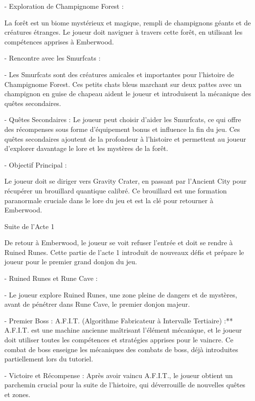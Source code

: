 - Exploration de Champignome Forest : 

 La forêt est un biome mystérieux et magique, rempli de champignons géants et de créatures étranges. Le joueur doit naviguer à travers cette forêt, en utilisant les compétences apprises à Emberwood. 

   

- Rencontre avec les Smurfcats : 

- Les Smurfcats sont des créatures amicales et importantes pour l'histoire de Champignome Forest. Ces petits chats bleus marchant sur deux pattes avec un champignon en guise de chapeau aident le joueur et introduisent la mécanique des quêtes secondaires. 

  - Quêtes Secondaires : Le joueur peut choisir d'aider les Smurfcats, ce qui offre des récompenses sous forme d'équipement bonus et influence la fin du jeu. Ces quêtes secondaires ajoutent de la profondeur à l'histoire et permettent au joueur d'explorer davantage le lore et les mystères de la forêt. 

  

- Objectif Principal : 

 Le joueur doit se diriger vers Gravity Crater, en passant par l'Ancient City pour récupérer un brouillard quantique calibré. Ce brouillard est une formation paranormale cruciale dans le lore du jeu et est la clé pour retourner à Emberwood. 

 

Suite de l'Acte 1 

  

De retour à Emberwood, le joueur se voit refuser l'entrée et doit se rendre à Ruined Runes. Cette partie de l'acte 1 introduit de nouveaux défis et prépare le joueur pour le premier grand donjon du jeu. 

  

- Ruined Runes et Rune Cave : 

  - Le joueur explore Ruined Runes, une zone pleine de dangers et de mystères, avant de pénétrer dans Rune Cave, le premier donjon majeur. 

  - Premier Boss : A.F.I.T. (Algorithme Fabricateur à Intervalle Tertiaire) :** A.F.I.T. est une machine ancienne maîtrisant l'élément mécanique, et le joueur doit utiliser toutes les compétences et stratégies apprises pour le vaincre. Ce combat de boss enseigne les mécaniques des combats de boss, déjà introduites partiellement lors du tutoriel. 

  - Victoire et Récompense : Après avoir vaincu A.F.I.T., le joueur obtient un parchemin crucial pour la suite de l'histoire, qui déverrouille de nouvelles quêtes et zones. 

